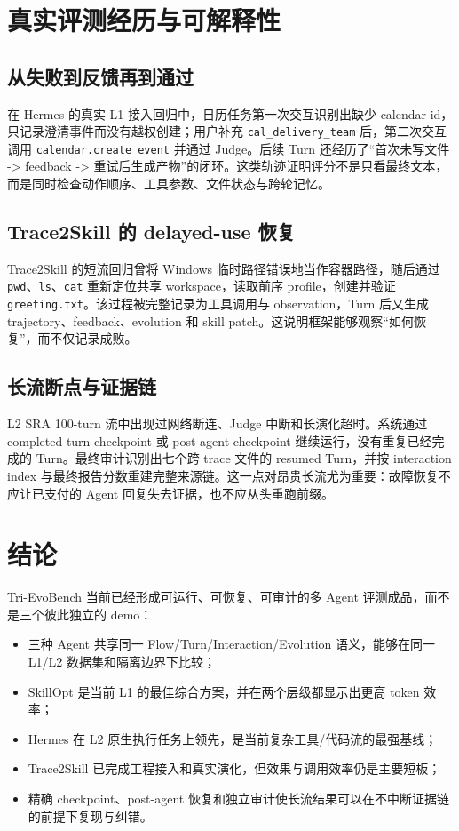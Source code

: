 \documentclass[11pt,a4paper]{article}
\newcommand{\code}[1]{\texttt{#1}}
\begin{document}
\section{真实评测经历与可解释性}

\subsection*{从失败到反馈再到通过}

在 Hermes 的真实 L1 接入回归中，日历任务第一次交互识别出缺少 calendar id，只记录澄清事件而没有越权创建；用户补充 \code{cal\_delivery\_team} 后，第二次交互调用 \code{calendar.create\_event} 并通过 Judge。后续 Turn 还经历了“首次未写文件 -> feedback -> 重试后生成产物”的闭环。这类轨迹证明评分不是只看最终文本，而是同时检查动作顺序、工具参数、文件状态与跨轮记忆。

\subsection*{Trace2Skill 的 delayed-use 恢复}

Trace2Skill 的短流回归曾将 Windows 临时路径错误地当作容器路径，随后通过 \code{pwd}、\code{ls}、\code{cat} 重新定位共享 workspace，读取前序 profile，创建并验证 \code{greeting.txt}。该过程被完整记录为工具调用与 observation，Turn 后又生成 trajectory、feedback、evolution 和 skill patch。这说明框架能够观察“如何恢复”，而不仅记录成败。

\subsection*{长流断点与证据链}

L2 SRA 100-turn 流中出现过网络断连、Judge 中断和长演化超时。系统通过 completed-turn checkpoint 或 post-agent checkpoint 继续运行，没有重复已经完成的 Turn。最终审计识别出七个跨 trace 文件的 resumed Turn，并按 interaction index 与最终报告分数重建完整来源链。这一点对昂贵长流尤为重要：故障恢复不应让已支付的 Agent 回复失去证据，也不应从头重跑前缀。

\section{结论}

Tri-EvoBench 当前已经形成可运行、可恢复、可审计的多 Agent 评测成品，而不是三个彼此独立的 demo：

\begin{itemize}
\item 三种 Agent 共享同一 Flow/Turn/Interaction/Evolution 语义，能够在同一 L1/L2 数据集和隔离边界下比较；
\item SkillOpt 是当前 L1 的最佳综合方案，并在两个层级都显示出更高 token 效率；
\item Hermes 在 L2 原生执行任务上领先，是当前复杂工具/代码流的最强基线；
\item Trace2Skill 已完成工程接入和真实演化，但效果与调用效率仍是主要短板；
\item 精确 checkpoint、post-agent 恢复和独立审计使长流结果可以在不中断证据链的前提下复现与纠错。
\end{itemize}
\end{document}
